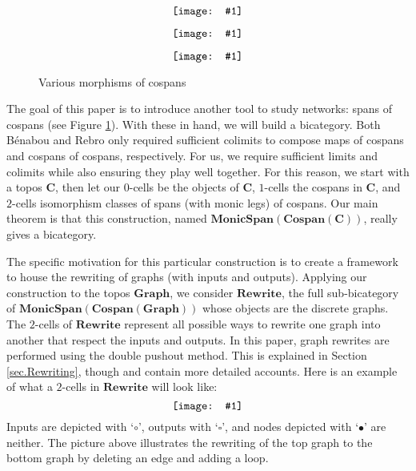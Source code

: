 \documentclass[11pt]{amsart}
\newcommand{\cat}[1]{\mathbf{#1}}
\newcommand{\diagram}[1]{\raisebox{-0.5\height}{\texttt{[image: \#1]}}}
\theoremstyle{remark}
\theoremstyle{definition}
\begin{document}
\begin{figure}
	\centering	
	\begin{minipage}[b]{0.3\textwidth}
	\[
		\diagram{Fig_MapOfCospans}
	\]
	\label{fig.MapOfCospans}
	\end{minipage}
	\begin{minipage}[b]{0.3\textwidth}
	\[
		\diagram{Fig_CospanOfCospans}
	\]
	\label{fig.CospanOfCospans}
	\end{minipage}
	\begin{minipage}[b]{0.3\textwidth}
	\[
		\diagram{Fig_SpanOfCospans}
	\]
	\label{fig.SpanOfCospans}
\end{minipage}
\caption{Various morphisms of cospans}
\end{figure}

The goal of this paper is to introduce another tool to study networks: spans of cospans (see Figure \ref{fig.SpanOfCospans}). With these in hand, we will build a bicategory.  Both B\'{e}nabou and Rebro only required sufficient colimits to compose maps of cospans and cospans of cospans, respectively. For us, we require sufficient limits and colimits while also ensuring they play well together. For this reason, we start with a topos $\cat{C}$, then let our $0$-cells be the objects of $\cat{C}$, $1$-cells the cospans in $\cat{C}$, and $2$-cells isomorphism classes of spans (with monic legs) of cospans. Our main theorem is that this construction, named $\cat{MonicSpan(Cospan(C))}$, really gives a bicategory. 

The specific motivation for this particular construction is to create a framework to house the rewriting of graphs (with inputs and outputs).  Applying our construction to the topos $\cat{Graph}$, we consider $\cat{Rewrite}$, the full sub-bicategory of $\cat{MonicSpan(Cospan(Graph))}$ whose objects are the discrete graphs. The $2$-cells of $\cat{Rewrite}$ represent all possible ways to rewrite one graph into another that respect the inputs and outputs. In this paper, graph rewrites are performed using the double pushout method. This is explained in Section \ref{sec.Rewriting}, though \cite{Ehrig_GraphGramAlgAp} and \cite{LackSoboc_AdhesiveCategories} contain more detailed accounts. Here is an example of what a $2$-cells in $\cat{Rewrite}$ will look like:
\[
	\label{NoRef_IntroRewrite2Cell}
	\diagram{NoRef_IntroRewrite2Cell}
\]
Inputs are depicted with `$\circ$', outputs with `$\square$', and nodes depicted with `$\bullet$' are neither. The picture above illustrates the rewriting of the top graph to the bottom graph by deleting an edge and adding a loop. 
\end{document}
